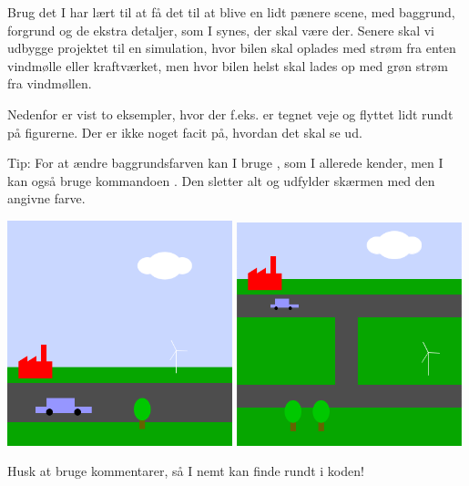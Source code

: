 \documentclass{ucph-handout}
\begin{document}
\begin{exercisebox}[adjusted title=Green City]
Brug det I har lært til at få det til at blive en lidt pænere scene,
med baggrund, forgrund og de ekstra detaljer, som I synes, der skal være
der. Senere skal vi udbygge projektet til en simulation, hvor bilen
skal oplades med strøm fra enten vindmølle eller kraftværket, men hvor
bilen helst skal lades op med grøn strøm fra vindmøllen.

Nedenfor er vist to eksempler, hvor der f.eks. er tegnet veje og
flyttet lidt rundt på figurerne. Der er ikke noget facit på, hvordan
det skal se ud.

\vspace{2mm}
\noindent
Tip: For at ændre baggrundsfarven  kan I bruge , som I
allerede kender, men I kan også bruge kommandoen .
Den sletter alt og udfylder skærmen med den angivne farve.

\begin{center}
  \includegraphics[width=0.49\textwidth]{../illustrations/images/elbil.png}
  \includegraphics[width=0.49\textwidth]{../illustrations/images/miniby.png}
\end{center}

\noindent
Husk at bruge kommentarer, så I nemt kan finde rundt i koden!
\end{exercisebox}
\end{document}
